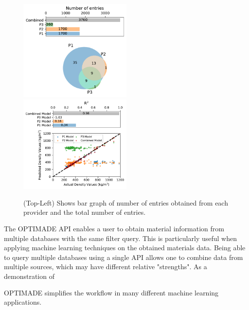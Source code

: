 \documentclass{article}
\begin{document}
	\begin{figure}
		\includegraphics[width=0.5\textwidth]{countVenn.pdf}
		\includegraphics[width=0.5\textwidth]{scatterPlot.pdf}
		\caption{(Top-Left) Shows bar graph of number of entries obtained from each provider and the total number of entries.} 
	\end{figure}
	The OPTIMADE API enables a user to obtain material information from multiple databases with the same filter query. This is particularly useful when applying machine learning techniques on the obtained materials data. Being able to query multiple databases using a single API allows one to combine data from multiple sources, which may have different relative "strengths". As a demonstration of 
	
	OPTIMADE simplifies the workflow in many different machine learning applications. 
\end{document}
